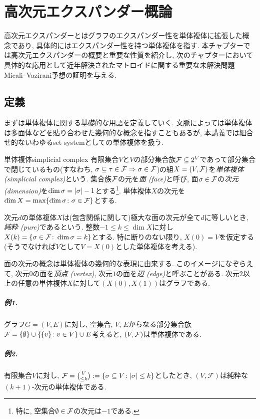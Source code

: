 \chapter{高次元エクスパンダー概論}
高次元エクスパンダーとはグラフのエクスパンダー性を単体複体に拡張した概念であり,
具体的にはエクスパンダー性を持つ単体複体を指す.
本チャプターでは高次元エクスパンダーの概要と重要な性質を紹介し,
次のチャプターにおいて具体的な応用として近年解決されたマトロイドに関する重要な未解決問題Micali--Vazirani予想の証明を与える.

\section{定義}
まずは単体複体に関する基礎的な用語を定義していく.
文脈によっては単体複体は多面体などを貼り合わせた幾何的な概念を指すこともあるが,
本講義では組合せ的ないわゆるset systemとしての単体複体を扱う.

\begin{definition}{単体複体}{simplicial complex}
有限集合$V$と$V$の部分集合族$\F\subseteq 2^V$であって部分集合で閉じているもの(すなわち, $\sigma\subseteq \tau \in \F \Rightarrow \sigma\in \F$)の組$X=(V,\F)$を\emph{単体複体 (simplicial complex)}という.
集合族$\F$の元を\emph{面 (face)}と呼び,
面$\sigma \in \F$の\emph{次元 (dimension)}を$\dim \sigma = \abs{\sigma} - 1$とする\footnote{特に, 空集合$\emptyset \in \F$の次元は$-1$である.}.
単体複体$X$の次元を$\dim X = \max\cbra{\dim \sigma \colon \sigma \in \F}$とする.

次元$d$の単体複体$X$は(包含関係に関して)極大な面の次元が全て$d$に等しいとき, \emph{純粋 (pure)}であるという.
整数$-1 \le k \le \dim X$に対し$X(k) = \cbra*{\sigma \in \F\colon \dim \sigma = k }$とする.
特に断りのない限り, $X(0)=V$を仮定する
(そうでなければ$V$として$V=X(0)$とした単体複体を考える).
\end{definition}
面の次元の概念は単体複体の幾何的な表現に由来する.
このイメージになぞらえて,
次元$0$の面を\emph{頂点 (vertex)}, 次元$1$の面を\emph{辺 (edge)}と呼ぶことがある.
次元$2$以上の任意の単体複体$X$に対して$(X(0),X(1))$はグラフである.

\paragraph*{例1.}
グラフ$G=(V,E)$に対し, 空集合, $V$, $E$からなる部分集合族
$\F = \{\emptyset\} \cup \cbra*{\{v\}\colon v \in V} \cup E$考えると,
$(V,\F)$は単体複体である.

\paragraph*{例2.}
有限集合$V$に対し,
$\F = \binom{V}{\le k} \defeq \cbra*{ \sigma \subseteq V \colon |\sigma|\le k}$としたとき, $(V,\mathcal{F})$は純粋な$(k+1)$-次元の単体複体である.

